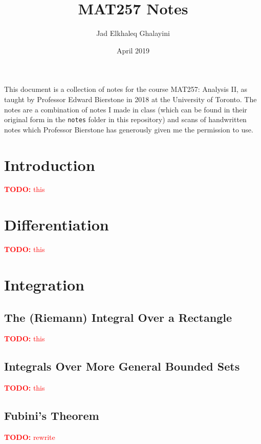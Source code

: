 \documentclass{article}
\title{MAT257 Notes}
\author{Jad Elkhaleq Ghalayini}
\date{April 2019}
\newcommand{\TODO}[1]{\textcolor{red}{\textbf{TODO:} #1}}
\begin{document}
\maketitle

This document is a collection of notes for the course MAT257: Analysis II, as taught by Professor Edward Bierstone in 2018 at the University of Toronto. The notes are a combination of notes I made in class (which can be found in their original form in the \verb|notes| folder in this repository) and scans of handwritten notes which Professor Bierstone has generously given me the permission to use.

\section{Introduction}

\TODO{this}

\section{Differentiation}

\TODO{this}

\section{Integration}

\subsection{The (Riemann) Integral Over a Rectangle}

\TODO{this}

\subsection{Integrals Over More General Bounded Sets}

\TODO{this}

\subsection{Fubini's Theorem}

\TODO{rewrite}
\end{document}

